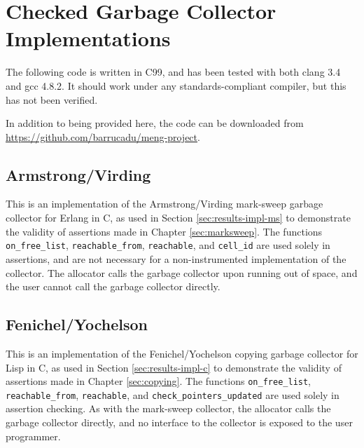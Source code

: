 \chapter{Checked Garbage Collector Implementations}
\label{sec:gc-impl}

\lstset{language=C}

The following code is written in C99, and has been tested with both
clang 3.4 and gcc 4.8.2. It should work under any standards-compliant
compiler, but this has not been verified.

In addition to being provided here, the code can be downloaded from
\url{https://github.com/barrucadu/meng-project}.

\section{Armstrong/Virding}
\label{sec:gc-impl-armstrong-virding}

This is an implementation of the Armstrong/Virding\cite{Armstrong95}
mark-sweep garbage collector for Erlang in C, as used in Section
\ref{sec:results-impl-ms} to demonstrate the validity of assertions
made in Chapter \ref{sec:marksweep}. The functions
\texttt{on\_free\_list}, \texttt{reachable\_from}, \texttt{reachable},
and \texttt{cell\_id} are used solely in assertions, and are not
necessary for a non-instrumented implementation of the collector. The
allocator calls the garbage collector upon running out of space, and
the user cannot call the garbage collector directly.

\lstset{label=lst:armstrong-virding-h}


\lstset{label=lst:armstrong-virding-c}


\section{Fenichel/Yochelson}
\label{sec:gc-impl-fenichel-yochelson}

This is an implementation of the Fenichel/Yochelson\cite{Fenichel69}
copying garbage collector for Lisp in C, as used in Section
\ref{sec:results-impl-c} to demonstrate the validity of assertions
made in Chapter \ref{sec:copying}. The functions
\texttt{on\_free\_list}, \texttt{reachable\_from}, \texttt{reachable},
and \texttt{check\_pointers\_updated} are used solely in assertion
checking. As with the mark-sweep collector, the allocator calls the
garbage collector directly, and no interface to the collector is
exposed to the user programmer.

